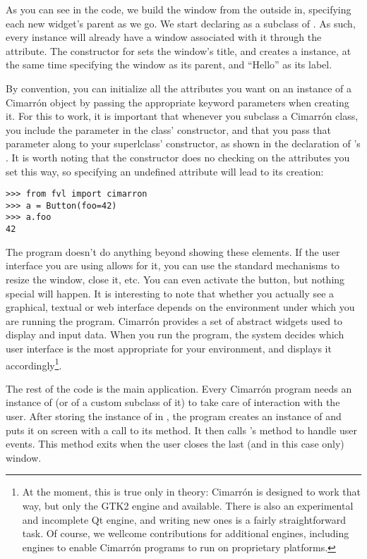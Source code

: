 \documentclass[a4paper]{howto}
\newcommand{\Cimarron}[0]{Cimarrón}
\begin{document}


As you can see in the code, we build the window from the outside in,
specifying each new widget's parent as we go. We start declaring
 as a subclass of
. As such, every instance will already have a
window associated with it through the  attribute. The
constructor for  sets the window's title,
and creates a  instance, at the same time specifying the
window as its parent, and ``Hello'' as its label.

By convention, you can initialize all the attributes you want on an
instance of a \Cimarron{} object by passing the appropriate keyword
parameters when creating it. For this to work, it is important that
whenever you subclass a \Cimarron{} class, you include the parameter
 in the class' constructor, and that you pass that parameter
along to your superlclass' constructor, as shown in the declaration of
's . It is worth noting
that the constructor does no checking on the attributes you set this
way, so specifying an undefined attribute will lead to its creation:

\begin{verbatim}
>>> from fvl import cimarron
>>> a = Button(foo=42)
>>> a.foo
42
\end{verbatim}

The program doesn't do anything beyond showing these elements. If the
user interface you are using allows for it, you can use the standard
mechanisms to resize the window, close it, etc. You can even activate
the button, but nothing special will happen. It is interesting to note
that whether you actually see a graphical, textual or web interface
depends on the environment under which you are running the
program. \Cimarron{} provides a set of abstract widgets used to display
and input data. When you run the program, the system decides which user
interface is the most appropriate for your environment, and displays it
accordingly\footnote{At the moment, this is true only in theory:
\Cimarron{} is designed to work that way, but only the GTK2 engine and
available. There is also an experimental and incomplete Qt engine, and
writing new ones is a fairly straightforward task.  Of course, we
wellcome contributions for additional engines, including engines to
enable \Cimarron{} programs to run on proprietary platforms.}.

The rest of the code is the main application. Every \Cimarron{} program
needs an instance of  (or of a custom subclass of it)
to take care of interaction with the user. After storing the instance of
 in , the program creates an instance of
 and puts it on screen with a call to its
 method. It then calls 's
 method to handle user events. This method exits when the
user closes the last (and in this case only) window.
\end{document}

